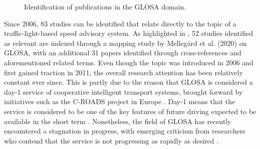 \begin{figure}[t]
\centering
{}
\caption{Identification of publications in the GLOSA domain.}
\label{fig:related-work-research-method}
\end{figure}

Since 2006, 83 studies can be identified that relate directly to the topic of a traffic-light-based speed advisory system. As highlighted in , 52 studies identified as relevant are indexed through a mapping study by Mellegård et al. (2020) \cite{mellegard_day_2020} on GLOSA, with an additional 31 papers identified through cross-references and aforementioned related terms. Even though the topic was introduced in 2006 and first gained traction in 2011, the overall research attention has been relatively constant ever since. This is partly due to the reason that GLOSA is considered a day-1 service of cooperative intelligent transport systems, brought forward by initiatives such as the C-ROADS project in Europe \cite{sharara_impact_2019}. Day-1 means that the service is considered to be one of the key features of future driving expected to be available in the short term \cite{mellegard_day_2020}. Nonetheless, the field of GLOSA has recently encountered a stagnation in progress, with emerging criticism from researchers who contend that the service is not progressing as rapidly as desired \cite{mellegard_day_2020, otto_framework_2023}.

